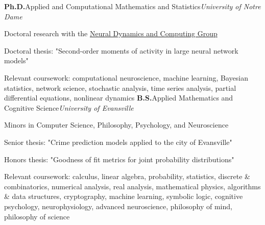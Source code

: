 \begin{rubric}{}
%
\entry*[2015 -- 2020]
    \textbf{Ph.D.}\cvbar Applied and Computational Mathematics and Statistics\cvbar \emph{University of Notre Dame}
    \par Doctoral research with the \href{https://robertrosenbaum.github.io/robertrosenbaum/ndcnd.html}{Neural Dynamics and Computing Group}
    \par Doctoral thesis: "Second-order moments of activity in large neural network models"

    \vspace*{2mm}

    \par Relevant coursework: computational neuroscience, machine learning, Bayesian statistics, network science, stochastic analysis, time series analysis, partial differential equations, nonlinear dynamics
%
\entry*[2011 -- 2015]
    \textbf{B.S.}\cvbar Applied Mathematics and Cognitive Science\cvbar \emph{University of Evansville}
    \par Minors in Computer Science, Philosophy, Psychology, and Neuroscience
    \par Senior thesis: "Crime prediction models applied to the city of Evansville"
    \par Honors thesis: "Goodness of fit metrics for joint probability distributions"

    \vspace*{2mm}

    \par Relevant coursework: calculus, linear algebra, probability, statistics, discrete \& combinatorics, numerical analysis, real analysis, mathematical physics, algorithms \& data structures, cryptography, machine learning, symbolic logic, cognitive psychology, neurophysiology, advanced neuroscience, philosophy of mind, philosophy of science
%
\end{rubric}
